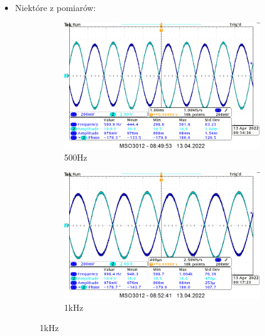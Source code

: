 \begin{itemize}
    \item Niektóre z pomiarów:
        { 
        \begin{figure}[H]
            \centering
            \begin{subfigure}[h]{0.4\textwidth}
                \includegraphics[width=\textwidth]{img/osciloscope/charakterystyka/1_500_cropped.png}
                \caption*{500Hz}
            \end{subfigure}
            \begin{subfigure}[h]{0.4\textwidth}
                \includegraphics[width=\textwidth]{img/osciloscope/charakterystyka/1_1khz_cropped.png}
                \caption*{1kHz}
            \end{subfigure}
        \end{figure}
        
}
\end{itemize}
